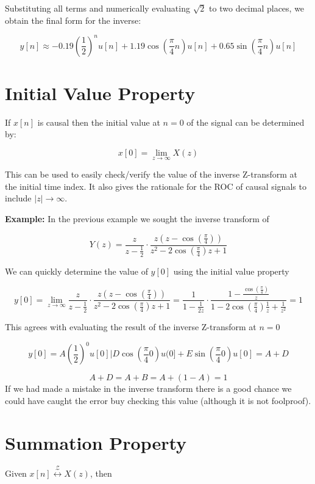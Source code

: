 \documentclass{article}
\begin{document}
Substituting all terms and numerically evaluating $\sqrt{2}$ to two decimal places, we obtain the final form for the inverse:

\[
y[n]\approx -0.19\left(\frac{1}{2}\right)^{n} u[n] + 1.19 \cos \left(\frac{\pi}{4} n\right) u[n] + 0.65 \sin \left(\frac{\pi}{4} n\right) u[n]
\]

\section{Initial Value Property}

If $x[n]$ is causal then the initial value at $n=0$ of the signal can be determined by:

\[
x[0] = \lim_{z\rightarrow \infty} X(z)
\]

This can be used to easily check/verify the value of the inverse Z-transform at the initial time index. It also gives the rationale for the ROC of causal signals to include $|z| \rightarrow\infty$.

\textbf{Example:} In the previous example we sought the inverse transform of

\[
Y(z) = \frac{z}{z-\frac{1}{2}} \cdot \frac{z\left(z-\cos\left(\frac{\pi}{4}\right)\right)}{z^2 -2\cos\left(\frac{\pi}{4}\right)z + 1}
\]

We can quickly determine the value of $y[0]$ using the initial value property

\[
y[0] = \lim_{z\rightarrow \infty} \frac{z}{z-\frac{1}{2}} \cdot \frac{z\left(z-\cos\left(\frac{\pi}{4}\right)\right)}{z^2 -2\cos\left(\frac{\pi}{4}\right)z + 1} = \frac{1}{1-\frac{1}{2z}} \cdot \frac{1-\frac{\cos\left(\frac{\pi}{4}\right)}{z}}{1 -2\cos\left(\frac{\pi}{4}\right)\frac{1}{z} + \frac{1}{z^2}} = 1
\]

This agrees with evaluating the result of the inverse Z-transform at $n=0$

\[
y[0]=A\left(\frac{1}{2}\right)^{0} u[0]|D \cos \left(\frac{\pi}{4} 0\right) u(0]+E \sin \left(\frac{\pi}{4} 0\right) u[0] = A + D
\]

\[
A + D = A + B = A + \left(1-A\right) = 1
\]
If we had made a mistake in the inverse transform there is a good chance we could have caught the error buy checking this value (although it is not foolproof).

\section{Summation Property}

Given $x[n] \stackrel{\mathcal{Z}}{\longleftrightarrow} X(z)$, then
\end{document}
